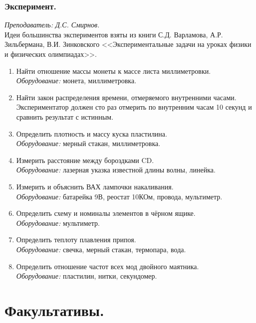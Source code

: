 \documentclass[11pt]{article}
\newlength{\h}
\newlength{\x}
\begin{document}
\subsubsection{Эксперимент.}
\label{sec:exp11}

\textit{Преподаватель: Д.С. Смирнов.}\\

Идеи большинства экспериментов взяты из книги С.Д. Варламова,
А.Р. Зильбермана, В.И. Зинковского <<Экспериментальные задачи на
уроках физики и физических олимпиадах>>.

\begin{enumerate}
\item Найти отношение массы монеты к массе листа миллиметровки.\\
  \textit{Оборудование:} монета, миллиметровка.
\item Найти закон распределения времени, отмеряемого внутренними
  часами. Экспериментатор должен сто раз отмерить по внутренним часам
  10 секунд и сравнить результат с истинным.
\item Определить плотность и массу куска пластилина.\\
  \textit{Оборудование:} мерный стакан, миллиметровка.
\item Измерить расстояние между бороздками CD.\\
  \textit{Оборудование:} лазерная указка известной длины волны,
  линейка.
\item Измерить и объяснить ВАХ лампочки накаливания.\\
  \textit{Оборудование:} батарейка 9В, реостат 10КОм, провода, мультиметр. 
\item Определить схему и номиналы элементов в чёрном ящике.\\
  \textit{Оборудование:} мультиметр. 
\item Определить теплоту плавления припоя.\\
  \textit{Оборудование:} свечка, мерный стакан, термопара, вода. 
\item Определить отношение частот всех мод двойного
  маятника.\\
  \textit{Оборудование:} пластилин, нитки, секундомер.
\end{enumerate}

\clearpage
\section{Факультативы.}
\label{sec:spec}
\end{document}
